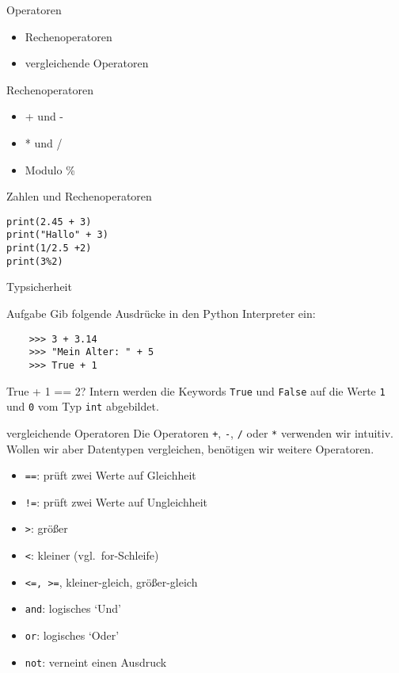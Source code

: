 \begin{frame}[fragile]{Operatoren}
	\begin{itemize}
		\item Rechenoperatoren 
		\item vergleichende Operatoren
	\end{itemize}
\end{frame}

\begin{frame}[fragile]{Rechenoperatoren}
\begin{itemize}
	\item + und -
	\item * und /
	\item Modulo \%
\end{itemize}
\end{frame}


\begin{frame}[fragile]{Zahlen und Rechenoperatoren}
\begin{lstlisting}
print(2.45 + 3)
print("Hallo" + 3)
print(1/2.5 +2)
print(3%2)
\end{lstlisting}
\end{frame}


\begin{frame}[fragile]{Typsicherheit}
\begin{block}{Aufgabe}
	Gib folgende Ausdrücke in den Python Interpreter ein:
	\begin{lstlisting}
	>>> 3 + 3.14
	>>> "Mein Alter: " + 5
	>>> True + 1
	\end{lstlisting}
\end{block}
\pause{}
\begin{exampleblock}{True + 1 == 2?}
	Intern werden die Keywords \lstinline{True} und \lstinline{False} auf die 
	Werte \texttt{1} und \texttt{0} vom Typ \texttt{int} abgebildet.
\end{exampleblock}
\end{frame}


\begin{frame}[fragile]{vergleichende Operatoren}
Die Operatoren \texttt{+}, \texttt{-}, \texttt{/} oder \texttt{*} verwenden wir intuitiv.\\ Wollen wir aber Datentypen vergleichen, benötigen wir weitere Operatoren.\\

\begin{itemize}
	\item \texttt{==}: prüft zwei Werte auf Gleichheit
	\item \texttt{!=}: prüft zwei Werte auf Ungleichheit
	\item \texttt{>}: größer
	\item \texttt{<}: kleiner (vgl.\ for-Schleife)
	\item \texttt{<=, >=}, kleiner-gleich, größer-gleich
	\item \texttt{and}: logisches `Und'
	\item \texttt{or}: logisches `Oder'
	\item \texttt{not}: verneint einen Ausdruck
\end{itemize}
\end{frame}

